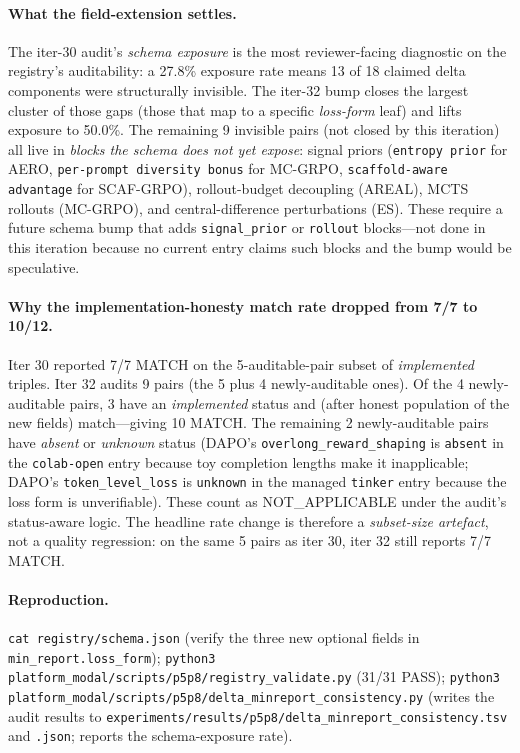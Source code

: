 \paragraph{What the field-extension settles.} The iter-30 audit's
\emph{schema exposure} is the most reviewer-facing diagnostic on the
registry's auditability: a 27.8\% exposure rate means 13 of 18
claimed delta components were structurally invisible. The iter-32 bump
closes the largest cluster of those gaps (those that map to a
specific \emph{loss-form} leaf) and lifts exposure to 50.0\%. The
remaining 9 invisible pairs (not closed by this iteration) all live in
\emph{blocks the schema does not yet expose}: signal priors
(\texttt{entropy prior} for AERO, \texttt{per-prompt diversity bonus}
for MC-GRPO, \texttt{scaffold-aware advantage} for SCAF-GRPO),
rollout-budget decoupling (AREAL), MCTS rollouts (MC-GRPO), and
central-difference perturbations (ES). These require a future
schema bump that adds \texttt{signal\_prior} or \texttt{rollout}
blocks---not done in this iteration because no current entry claims such
blocks and the bump would be speculative.

\paragraph{Why the implementation-honesty match rate dropped from 7/7
to 10/12.} Iter 30 reported 7/7 MATCH on the 5-auditable-pair subset
of \emph{implemented} triples. Iter 32 audits 9 pairs (the 5 plus 4
newly-auditable ones). Of the 4 newly-auditable pairs, 3 have an
\emph{implemented} status and (after honest population of the new
fields) match---giving 10 MATCH. The remaining 2 newly-auditable
pairs have \emph{absent} or \emph{unknown} status (DAPO's
\texttt{overlong\_reward\_shaping} is \texttt{absent} in the
\texttt{colab-open} entry because toy completion lengths make it
inapplicable; DAPO's \texttt{token\_level\_loss} is \texttt{unknown}
in the managed \texttt{tinker} entry because the loss form is
unverifiable). These count as NOT\_APPLICABLE under the audit's
status-aware logic. The headline rate change is therefore a
\emph{subset-size artefact}, not a quality regression: on the same 5
pairs as iter 30, iter 32 still reports 7/7 MATCH.

\paragraph{Reproduction.} \texttt{cat registry/schema.json} (verify the
three new optional fields in \texttt{min\_report.loss\_form});
\texttt{python3 platform_modal/scripts/p5p8/registry\_validate.py} (31/31 PASS);
\texttt{python3 platform_modal/scripts/p5p8/delta\_minreport\_consistency.py}
(writes the audit results to
\texttt{experiments/results/p5p8/delta\_minreport\_consistency.tsv}
and \texttt{.json}; reports the schema-exposure rate).
